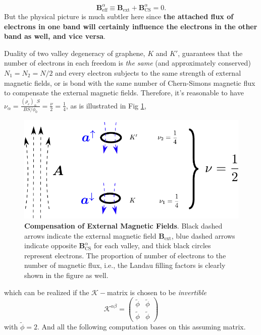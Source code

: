 \documentclass[bachelor,english,numbers]{ustcthesis}
\begin{document}
		\begin{equation}\label{2.2.6}
			\bm{B}^\alpha_{\text{eff}}\equiv\bm{B}_{\text{ext}}+\bm{B}^\alpha_{\text{CS}}=0.
		\end{equation}
		But the physical picture is much subtler here since {\bf the attached flux of electrons in one band will certainly influence the electrons in the other band as well, and vice versa}.\par
		Duality of two valley degeneracy of graphene, $K$ and $K'$, guarantees that the number of electrons in each freedom is \emph{the same} (and approximately conserved) $N_1=N_2=N/2$ and every electron subjects to the same strength of external magnetic fields, or is bond with the same number of Chern-Simons magnetic flux to compensate the external magnetic fields. Therefore, it's reasonable to have $\nu_\alpha=\frac{(\rho_e)_{\alpha}S}{BS/\phi_0}=\frac{\nu}{2}=\frac{1}{4}$, as is illustrated in Fig \ref{fig:2},
		\begin{figure}[!htp]
			\centering
			\includegraphics[scale=1.0]{Half-filling.pdf}
			\caption{{\bf Compensation of External Magnetic Fields}. Black dashed arrows indicate the external magnetic field $\bm{B}_{\text{ext}}$, blue dashed arrows indicate opposite $\bm{B}_{\text{CS}}^\alpha$ for each valley, and thick black circles represent electrons. The proportion of number of electrons to the number of magnetic flux, i.e., the Landau filling factors is clearly shown in the figure as well.}
			\label{fig:2}
		\end{figure}
		which can be realized if the $\mathcal{K}-$matrix is chosen to be \emph{invertible}
		\begin{equation}\label{2.2.7}
			\mathcal{K}^{\alpha \beta}=\left(\begin{array}{cc}
				\widetilde{\phi}  & \widetilde{\phi}  \\ \widetilde{\phi}  & \widetilde{\phi} 
			\end{array}\right)
		\end{equation}
		with $\widetilde{\phi}=2$. And all the following computation bases on this assuming matrix.
\end{document}
